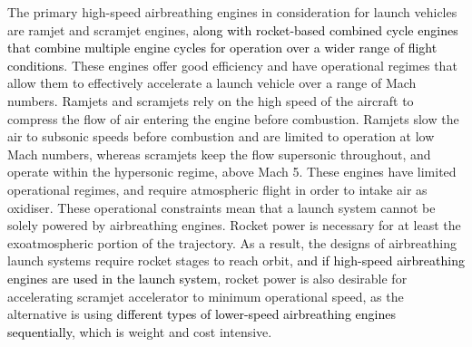   	The primary high-speed airbreathing engines in consideration for launch vehicles are ramjet and scramjet engines, \textcolor{black}{along with rocket-based combined cycle engines that combine multiple engine cycles for operation over a wider range of flight conditions}\cite{HeiserWilliamPratt1994,Kors1988}. These engines offer good efficiency and have operational regimes that allow them to effectively accelerate a launch vehicle over a range of Mach numbers. 
  	Ramjets and scramjets rely on the high speed of the aircraft to compress the flow of air entering the engine before combustion.  Ramjets slow the air to subsonic speeds before combustion and are limited to operation at low Mach numbers, whereas scramjets keep the flow supersonic throughout, and operate within the hypersonic regime, above Mach 5. 
  	These engines have limited operational regimes, and require atmospheric flight in order to intake air as oxidiser. These operational constraints mean that a launch system cannot be solely powered by airbreathing engines. Rocket power is necessary for at least the exoatmospheric portion of the trajectory. As a result, the designs of airbreathing launch systems require rocket stages to reach orbit\cite{Smart2009a}, \textcolor{black}{and if high-speed airbreathing engines are used in the launch system}, rocket power is also desirable for accelerating scramjet accelerator to minimum operational speed, as the alternative is using \textcolor{black}{different types of lower-speed airbreathing engines sequentially}\cite{Smart2009a}, which is weight and cost intensive. 
  	
